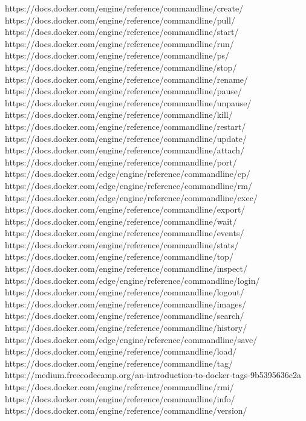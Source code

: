\documentclass[]{article}
\begin{document}
\begin{thebibliography}{99}
	
	https://docs.docker.com/engine/reference/commandline/create/
	https://docs.docker.com/engine/reference/commandline/pull/
	https://docs.docker.com/engine/reference/commandline/start/
	https://docs.docker.com/engine/reference/commandline/run/
	https://docs.docker.com/engine/reference/commandline/ps/
	https://docs.docker.com/engine/reference/commandline/stop/
	https://docs.docker.com/engine/reference/commandline/rename/
	https://docs.docker.com/engine/reference/commandline/pause/
	https://docs.docker.com/engine/reference/commandline/unpause/
	https://docs.docker.com/engine/reference/commandline/kill/
	https://docs.docker.com/engine/reference/commandline/restart/
	https://docs.docker.com/engine/reference/commandline/update/
	https://docs.docker.com/engine/reference/commandline/attach/
	https://docs.docker.com/engine/reference/commandline/port/
	https://docs.docker.com/edge/engine/reference/commandline/cp/
	https://docs.docker.com/edge/engine/reference/commandline/rm/
	https://docs.docker.com/edge/engine/reference/commandline/exec/
	https://docs.docker.com/engine/reference/commandline/export/
	https://docs.docker.com/engine/reference/commandline/wait/
	https://docs.docker.com/engine/reference/commandline/events/
	https://docs.docker.com/engine/reference/commandline/stats/
	https://docs.docker.com/engine/reference/commandline/top/
	https://docs.docker.com/engine/reference/commandline/inspect/
	https://docs.docker.com/edge/engine/reference/commandline/login/
	https://docs.docker.com/engine/reference/commandline/logout/
	https://docs.docker.com/engine/reference/commandline/images/
	https://docs.docker.com/engine/reference/commandline/search/
	https://docs.docker.com/engine/reference/commandline/history/
	https://docs.docker.com/edge/engine/reference/commandline/save/
	https://docs.docker.com/engine/reference/commandline/load/
	https://docs.docker.com/engine/reference/commandline/tag/
	https://medium.freecodecamp.org/an-introduction-to-docker-tags-9b5395636c2a
	https://docs.docker.com/engine/reference/commandline/rmi/
	https://docs.docker.com/engine/reference/commandline/info/
	https://docs.docker.com/engine/reference/commandline/version/
\end{thebibliography}
\end{document}
